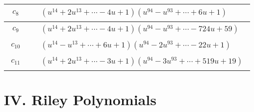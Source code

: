 \documentclass[1p]{elsarticle_modified}
\theoremstyle{definition}
\begin{document}
\begin{tabular}{m{50pt}|m{274pt}}
\hline $$\begin{aligned}c_{8}\end{aligned}$$&$\begin{aligned}
&(u^{14}+2 u^{13}+\cdots-4 u+1)(u^{94}- u^{93}+\cdots+6 u+1)
\end{aligned}$\\
\hline $$\begin{aligned}c_{9}\end{aligned}$$&$\begin{aligned}
&(u^{14}+2 u^{13}+\cdots-4 u+1)(u^{94}- u^{93}+\cdots-724 u+59)
\end{aligned}$\\
\hline $$\begin{aligned}c_{10}\end{aligned}$$&$\begin{aligned}
&(u^{14}- u^{13}+\cdots+6 u+1)(u^{94}-2 u^{93}+\cdots-22 u+1)
\end{aligned}$\\
\hline $$\begin{aligned}c_{11}\end{aligned}$$&$\begin{aligned}
&(u^{14}+2 u^{13}+\cdots-3 u+1)(u^{94}-3 u^{93}+\cdots+519 u+19)
\end{aligned}$\\
\hline
\end{tabular}\newpage\renewcommand{\arraystretch}{1}
\centering \section*{ IV. Riley Polynomials}
\end{document}
